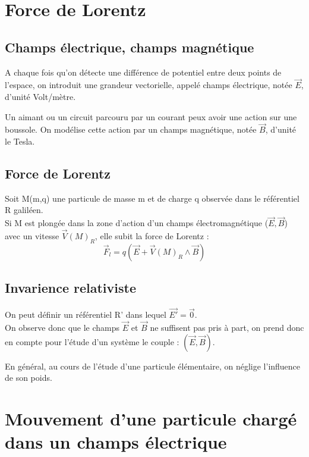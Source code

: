 \chapter{Force de Lorentz}
\section{Champs électrique, champs magnétique}
\begin{de}
A chaque fois qu'on détecte une différence de potentiel entre deux points de l'espace, on introduit une grandeur vectorielle, appelé champs électrique, notée $\overrightarrow{E}$, d'unité Volt/mètre.
\end{de}
\begin{de}
Un aimant ou un circuit parcouru par un courant peux avoir une action sur une boussole. On modélise cette action par un champs magnétique, notée $\overrightarrow{B}$, d'unité le Tesla.
\end{de}
\section{Force de Lorentz}
\begin{de}
Soit M(m,q) une particule de masse m et de charge q observée dans le référentiel R galiléen.\\
Si M est plongée dans la zone d'action d'un champs électromagnétique ($\overrightarrow{E},\overrightarrow{B}$) avec un vitesse $\overrightarrow{V}(M)_R$, elle subit la force de Lorentz :
$$\overrightarrow{F}_l = q(\overrightarrow{E}+\overrightarrow{V}(M)_R\wedge\overrightarrow{B})$$
\end{de}
\section{Invarience relativiste}
\begin{prop}
On peut définir un référentiel R' dans lequel $\overrightarrow{E'}=\overrightarrow{0}$.\\
On observe donc que le champs $\overrightarrow{E}$ et $\overrightarrow{B}$ ne suffisent pas pris à part, on prend donc en compte pour l'étude d'un système le couple : $(\overrightarrow{E},\overrightarrow{B})$.
\end{prop}
\begin{prop}
En général, au cours de l'étude d'une particule élémentaire, on néglige l'influence de son poids.
\end{prop}
\chapter{Mouvement d'une particule chargé dans un champs électrique}
